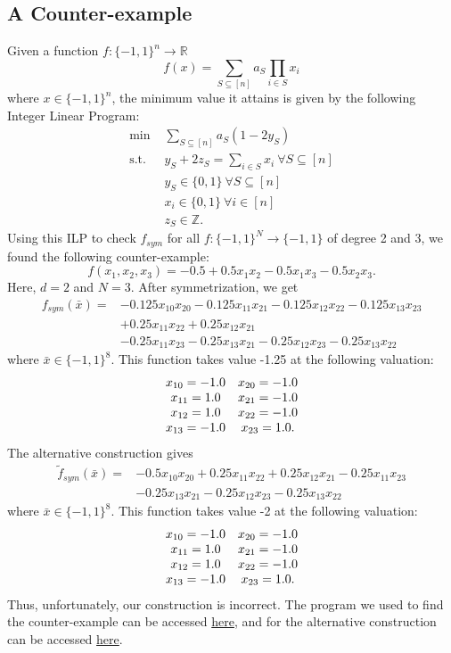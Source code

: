 \documentclass[12pt]{report}
\begin{document}
\subsection{A Counter-example}
Given a function $f\colon \{-1,1\}^n \rightarrow \mathbb{R}$
$$
f(x) = \sum_{S\subseteq [n]} a_{S} \prod_{i\in S}x_i
$$
where $x\in \{-1,1\}^n$, the minimum value it attains is given by the following Integer Linear Program:
\begin{align*}
\text{min } & \sum_{S\subseteq [n]} a_{S}(1-2y_S) \\
\text{s.t. } & y_S+2z_S=\sum_{i\in S} x_i ~\forall S\subseteq [n] \\
& y_S\in \{0,1\} ~\forall S\subseteq [n] \\
& x_i \in \{0,1\} ~\forall i \in [n] \\
& z_S\in \mathbb{Z}.
\end{align*}
Using this ILP to check $f_{sym}$ for all $f\colon \{-1,1\}^N \rightarrow \{-1,1\}$ of degree 2 and 3, we found the following counter-example:
$$f(x_1, x_2, x_3) = -0.5+0.5x_1x_2-0.5x_1x_3-0.5x_2x_3.$$
Here, $d = 2$ and $N = 3$. After symmetrization, we get
\begin{align*}
f_{sym}(\bar{x})=&-0.125x_{10}x_{20}-0.125x_{11}x_{21}-0.125x_{12}x_{22}-0.125x_{13}x_{23} \\
&+0.25x_{11}x_{22}+0.25x_{12}x_{21} \\
&-0.25x_{11}x_{23}-0.25x_{13}x_{21}-0.25x_{12}x_{23}-0.25x_{13}x_{22}  
\end{align*}
where $\bar{x} \in \{-1,1\}^8$. This function takes value -1.25 at the following valuation:
\[\begin{array}{c c}
x_{10} = -1.0 & x_{20} = -1.0 \\
x_{11}= 1.0 & x_{21} = -1.0 \\
x_{12} = 1.0 & x_{22} = -1.0 \\
x_{13} = -1.0 & x_{23} = 1.0.
\end{array}\]
The alternative construction gives
\begin{align*}
\tilde{f}_{sym}(\bar{x})=&-0.5x_{10}x_{20}+0.25x_{11}x_{22}+0.25x_{12}x_{21}-0.25x_{11}x_{23} \\
&-0.25x_{13}x_{21}-0.25x_{12}x_{23}-0.25x_{13}x_{22}
\end{align*}
where $\bar{x} \in \{-1,1\}^8$. This function takes value -2 at the following valuation:
\[\begin{array}{c c}
x_{10} = -1.0 & x_{20} = -1.0 \\
x_{11}= 1.0 & x_{21} = -1.0 \\
x_{12} = 1.0 & x_{22} = -1.0 \\
x_{13} = -1.0 & x_{23} = 1.0.
\end{array}\]
Thus, unfortunately, our construction is incorrect. The program we used to find
the counter-example can be accessed  \href{https://gist.github.com/akashks1998/f00e1204654503b99a78cd05374819b1}{here}, and for the alternative construction can be accessed \href{https://gist.github.com/akashks1998/8147d12f40da6534a7f70be3d18fee02}{here}.
\end{document}

